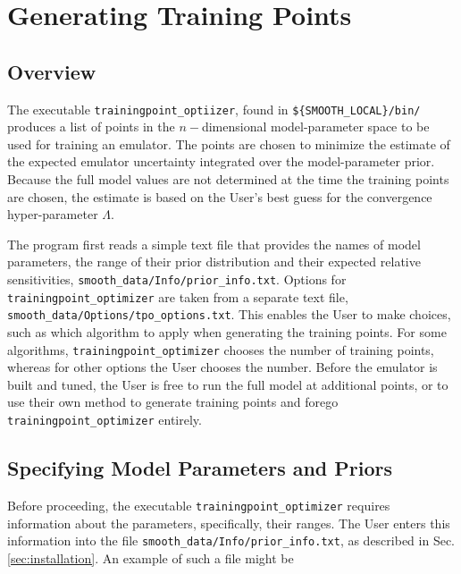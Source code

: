\documentclass[UserManual.tex]{subfiles}
\begin{document}
\begin{sloppypar}

\section{Generating Training Points}\label{sec:tpo}

\subsection{Overview}
The executable {\tt trainingpoint\_optiizer}, found in {\tt \$\{SMOOTH\_LOCAL\}/bin/} produces a list of points in the $n-$dimensional model-parameter space to be used for training an emulator. The points are chosen to minimize the estimate of the expected emulator uncertainty integrated over the model-parameter prior. Because the full model values are not determined at the time the training points are chosen, the estimate is based on the User's best guess for the convergence hyper-parameter $\Lambda$. 

The program first reads a simple text file that provides the names of model parameters, the range of their prior distribution and their expected relative sensitivities, {\tt smooth\_data/Info/prior\_info.txt}. Options for {\tt trainingpoint\_optimizer} are taken from a separate text file, {\tt smooth\_data/Options/tpo\_options.txt}. This enables the User to make choices, such as which algorithm to apply when generating the training points. For some algorithms, {\tt trainingpoint\_optimizer} chooses the number of training points, whereas for other options the User chooses the number. Before the emulator is built and tuned, the User is free to run the full model at additional points, or to use their own method to generate training points and forego {\tt trainingpoint\_optimizer} entirely.

\subsection{Specifying Model Parameters and Priors}\label{subsec:priorinfo}
Before proceeding, the executable {\tt trainingpoint\_optimizer} requires information about the parameters, specifically, their ranges. The User enters this information into the file {\tt smooth\_data/Info/prior\_info.txt}, as described in Sec. \ref{sec:installation}. An example of such a file might be
{\tt\vspace*{-8pt}{\tt \begin{Verbatim}[commandchars=\\\{\}]
# par_name dist_type  xmin/centroid  xmax/Rgauss  SensitivityScale
   parameter_name_0 prior_type_0 xmin_0/centroid_0 xmax_0/width_0 s_0
   parameter_name_1 prior_type_0 xmin_1/centroid_1 xmax_1/width_1 s_1
   

\end{Verbatim}}}
\end{sloppypar}
\end{document}
